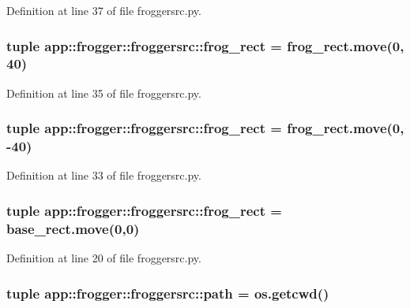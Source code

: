 Definition at line 37 of file froggersrc.py.
\subsubsection{\setlength{\rightskip}{0pt plus 5cm}tuple {\bf app::frogger::froggersrc::frog\_\-rect} = frog\_\-rect.move(0, 40)\hspace{0.3cm}{\tt  [static]}}\label{namespaceapp_1_1frogger_1_1froggersrc_23072300a3dbff400d01dfdcaaed3401}




Definition at line 35 of file froggersrc.py.
\subsubsection{\setlength{\rightskip}{0pt plus 5cm}tuple {\bf app::frogger::froggersrc::frog\_\-rect} = frog\_\-rect.move(0, -40)\hspace{0.3cm}{\tt  [static]}}\label{namespaceapp_1_1frogger_1_1froggersrc_23072300a3dbff400d01dfdcaaed3401}




Definition at line 33 of file froggersrc.py.
\subsubsection{\setlength{\rightskip}{0pt plus 5cm}tuple {\bf app::frogger::froggersrc::frog\_\-rect} = base\_\-rect.move(0,0)\hspace{0.3cm}{\tt  [static]}}\label{namespaceapp_1_1frogger_1_1froggersrc_23072300a3dbff400d01dfdcaaed3401}




Definition at line 20 of file froggersrc.py.
\subsubsection{\setlength{\rightskip}{0pt plus 5cm}tuple {\bf app::frogger::froggersrc::path} = os.getcwd()\hspace{0.3cm}{\tt  [static]}}\label{namespaceapp_1_1frogger_1_1froggersrc_bcf02239c0caa903e06061916b183645}




